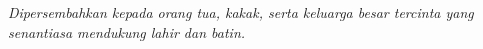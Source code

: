 \clearpage
{}
\begin{center}
  \vspace*{\fill}
  \emph{Dipersembahkan kepada orang tua, kakak, serta keluarga besar tercinta yang senantiasa mendukung lahir dan batin.}
  \vspace*{\fill}
\end{center}
